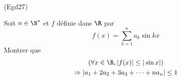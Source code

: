\begin{tiny}(Egd27)\end{tiny} Soit $n\in\N^*$ et $f$ définie dans $\R$ par
\begin{displaymath}
 f(x) = \sum_{k=1}^na_k\sin kx
\end{displaymath}
Montrer que
\begin{multline*}
 \left(\forall x \in \R, |f(x)|\leq |\sin x| \right) \\
\Rightarrow
|a_1 + 2a_2 + 3a_3+\cdots+na_n|\leq 1 
\end{multline*}
 